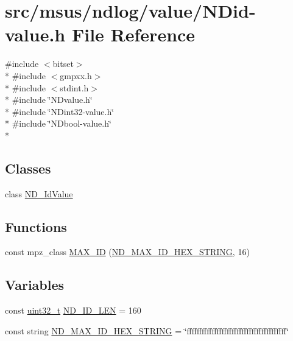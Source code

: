 \hypertarget{_n_did-value_8h}{\section{src/msus/ndlog/value/\-N\-Did-\/value.h File Reference}
\label{_n_did-value_8h}
}
{\ttfamily \#include $<$bitset$>$}\\*
{\ttfamily \#include $<$gmpxx.\-h$>$}\\*
{\ttfamily \#include $<$stdint.\-h$>$}\\*
{\ttfamily \#include \char`\"{}N\-Dvalue.\-h\char`\"{}}\\*
{\ttfamily \#include \char`\"{}N\-Dint32-\/value.\-h\char`\"{}}\\*
{\ttfamily \#include \char`\"{}N\-Dbool-\/value.\-h\char`\"{}}\\*
\subsection*{Classes}
\begin{DoxyCompactItemize}
\item 
class \hyperlink{class_n_d___id_value}{N\-D\-\_\-\-Id\-Value}
\end{DoxyCompactItemize}
\subsection*{Functions}
\begin{DoxyCompactItemize}
\item 
const mpz\-\_\-class \hyperlink{_n_did-value_8h_a5574b5a9c804b8d211712d054ea176e9}{M\-A\-X\-\_\-\-I\-D} (\hyperlink{_n_did-value_8h_ad13036186ac04504230e1fd74f5477d9}{N\-D\-\_\-\-M\-A\-X\-\_\-\-I\-D\-\_\-\-H\-E\-X\-\_\-\-S\-T\-R\-I\-N\-G}, 16)
\end{DoxyCompactItemize}
\subsection*{Variables}
\begin{DoxyCompactItemize}
\item 
const \hyperlink{msus_2webserver_2uthash_8h_a435d1572bf3f880d55459d9805097f62}{uint32\-\_\-t} \hyperlink{_n_did-value_8h_ae013c4e072a3fc8640f771f3e4c0e4b6}{N\-D\-\_\-\-I\-D\-\_\-\-L\-E\-N} = 160
\item 
const string \hyperlink{_n_did-value_8h_ad13036186ac04504230e1fd74f5477d9}{N\-D\-\_\-\-M\-A\-X\-\_\-\-I\-D\-\_\-\-H\-E\-X\-\_\-\-S\-T\-R\-I\-N\-G} = \char`\"{}ffffffffffffffffffffffffffffffffffffffff\char`\"{}
\end{DoxyCompactItemize}


